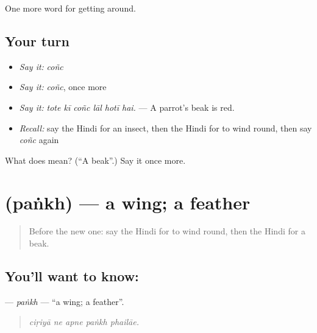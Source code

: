 \begin{grammarlens}[title={What you've built}]
One more word for getting around.
\end{grammarlens}

\subsection*{Your turn}
\begin{itemize}
\raggedright
  \item \emph{Say it:} \emph{coñc}
  \item \emph{Say it:} \emph{coñc}, once more
  \item \emph{Say it:} \emph{tote kī coñc lāl hotī hai.} — A parrot's beak is red.
  \item \emph{Recall:} say the Hindi for an insect, then the Hindi for to wind round, then say \emph{coñc} again
\end{itemize}

\begin{tcolorbox}[breakable,colback=teal!4,colframe=teal!35!black,title={Before you move on}]
What does  mean? (\textquotedblleft{}A beak\textquotedblright{}.) Say it once more.
\end{tcolorbox}
\section[\texorpdfstring{\hi{पंख} (paṅkh)}{पंख (paṅkh)}]{ (paṅkh) — a wing; a feather}

\label{lesson:HI-C448-pankh}



\begin{quote}
Before the new one: say the Hindi for to wind round, then the Hindi for a beak.
\end{quote}

\subsection*{You'll want to know: }
\textbf{} — \emph{paṅkh} — \textquotedblleft{}a wing; a feather\textquotedblright{}.

\begin{quote}
    
\end{quote}

\begin{quote}
\emph{ciṛiyā ne apne paṅkh phailāe.}
\end{quote}

